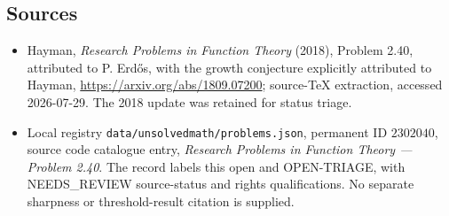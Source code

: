 \documentclass[11pt]{article}
\begin{document}
\subsection{Sources}
\begin{itemize}
\item Hayman, \emph{Research Problems in Function Theory} (2018), Problem 2.40, attributed to P. Erd\H{o}s, with the growth conjecture explicitly attributed to Hayman, \url{https://arxiv.org/abs/1809.07200}; source-TeX extraction, accessed 2026-07-29. The 2018 update was retained for status triage.
\item Local registry \texttt{data/unsolvedmath/problems.json}, permanent ID $2302040$, source code catalogue entry, \emph{Research Problems in Function Theory --- Problem 2.40}. The record labels this open and OPEN-TRIAGE, with NEEDS\_REVIEW source-status and rights qualifications. No separate sharpness or threshold-result citation is supplied.
\end{itemize}
\end{document}
